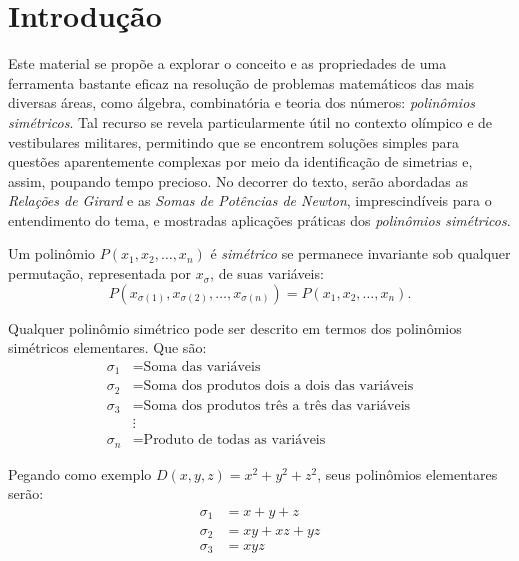 \chapter{Introdução}

Este material se propõe a explorar o conceito e as propriedades de uma ferramenta bastante eficaz na resolução de problemas matemáticos das mais diversas áreas, como álgebra, combinatória e teoria dos números: \textit{polinômios simétricos}. Tal recurso se revela particularmente útil no contexto olímpico e de vestibulares militares, permitindo que se encontrem soluções simples para questões aparentemente complexas por meio da identificação de simetrias e, assim, poupando tempo precioso. No decorrer do texto, serão abordadas as \textit{Relações de Girard} e as \textit{Somas de Potências de Newton}, imprescindíveis para o entendimento do tema, e mostradas aplicações práticas dos \textit{polinômios simétricos}.

\begin{definicao}
	Um polinômio $P(x_1, x_2, \dots, x_n)$ é \textit{simétrico} se permanece invariante sob qualquer permutação, representada por $x_\sigma$, de suas variáveis:
	\begin{equation*}
		P(x_{\sigma(1)}, x_{\sigma(2)}, \dots, x_{\sigma(n)}) = P(x_1, x_2, \dots, x_n).
	\end{equation*}
\end{definicao}

\begin{teorema}
Qualquer polinômio simétrico pode ser descrito em termos dos polinômios simétricos elementares. Que são:
	\begin{align*}
	    \sigma_1 &= \text{Soma das variáveis} \\
	    \sigma_2 &= \text{Soma dos produtos dois a dois das variáveis} \\
	    \sigma_3 &= \text{Soma dos produtos três a três das variáveis} \\
	             & \vdots \\
	    \sigma_n &= \text{Produto de todas as variáveis}
	\end{align*}
\end{teorema}

Pegando como exemplo $D(x, y, z) = x^2 + y^2 + z^2$, seus polinômios elementares serão:
\begin{align*}
	\sigma_1 & = x + y + z\\
	\sigma_2 & = xy + xz + yz \\
	\sigma_3 & = xyz
\end{align*}

